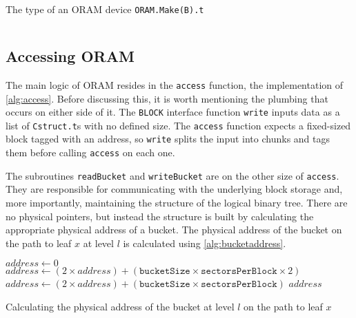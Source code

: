 \documentclass[12pt,a4paper,twoside,openright]{report}
\begin{document}
\begin{listing}[t]
\caption{The type of an ORAM device \texttt{ORAM.Make(B).t}}
\label{lst:orammaketype}
\inputminted[fontsize=\scriptsize,firstline=87, lastline=118]{ocaml}{../mirage-oram/lib/oram.ml}
\end{listing}



\subsection{Accessing ORAM}

The main logic of ORAM resides in the \texttt{access} function, the implementation of \cref{alg:access}. Before discussing this, it is worth mentioning the plumbing that occurs on either side of it. The \texttt{BLOCK} interface function \texttt{write} inputs data as a list of \texttt{Cstruct.t}s with no defined size. The \texttt{access} function expects a fixed-sized block tagged with an address, so \texttt{write} splits the input into chunks and tags them before calling \texttt{access} on each one.

The subroutines \texttt{readBucket} and \texttt{writeBucket} are on the other size of \texttt{access}. They are responsible for communicating with the underlying block storage and, more importantly, maintaining the structure of the logical binary tree. There are no physical pointers, but instead the structure is built by calculating the appropriate physical address of a bucket. The physical address of the bucket on the path to leaf $x$ at level $l$ is calculated using \cref{alg:bucketaddress}.

\begin{algorithm}[t]
  \footnotesize
  \begin{algorithmic}
  \vskip 10pt
      \State $address \gets 0$
          \State $address \gets (2 \times address) + (\mathtt{bucketSize} \times \mathtt{sectorsPerBlock} \times 2)$
        \Else
          \State $address \gets (2 \times address) + (\mathtt{bucketSize} \times \mathtt{sectorsPerBlock})$
        \EndIf
      \EndFor
      \State \Return $address$
    \EndFunction
  \vskip 10pt
  \end{algorithmic}
  \caption{Calculating the physical address of the bucket at level $l$ on the path to leaf $x$}
  \label{alg:bucketaddress}
\end{algorithm}
\end{document}
